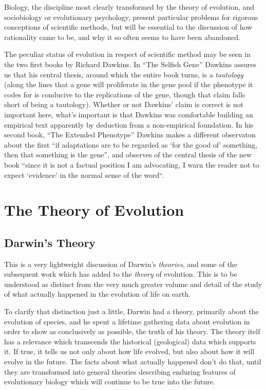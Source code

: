 \documentclass[10pt,titlepage]{book}
\begin{document}
Biology, the discipline most clearly transformed by the theory of evolution, and sociobiology or 
evolutionary psychology, present particular problems for rigorous conceptions of scientific methods, but will be essential to the discussion of how rationality came to be, and why it so often seems to have been abandoned.

The peculiar status of evolution in respect of scientific method may be seen in the two first books by Richard Dawkins.
In ``The Selfish Gene''\cite{dawkinsSG} Dawkins assures us that his central thesis, around which the entire book turns, is a \emph{tautology} (along the lines that a gene will proliferate in the gene pool if the phenotype it codes for is conducive to the replications of the gene, though that claim falls short of being a tautology).
Whether or not Dawkins' claim is correct is not important here, what's important is that Dawkins was comfortable building an empirical text apparently by deduction from a non-empirical foundation.
In his second book, ``The Extended Phenotype''\cite{dawkinsEP} Dawkins makes a different observaton about the first ``if adaptations are to be regarded as `for the good of' something, then that something is the gene'', and observes of the central thesis of the new book ``since it is not a factual position I am advocating, I warn the reader not to expect `evidence' in the normal sense of the word``.


\section{The Theory of Evolution}

\subsection{Darwin's Theory}

This is a very lightweight discussion of Darwin's \emph{theories}, and some of the subsequent work which has added to the \emph{theory} of evolution.
This is to be understood as distinct from the very much greater volume and detail of the study of what actually happened in the evolution of life on earth.

To clarify that distinction just a little, Darwin had a theory, primarily about the evolution of species, and he spent a lifetime gathering data about evolution in order to show as conclusively as possible, the truth of his theory.
The theory itelf has a relevance which transcends the historical (geological) data which supports it.
If true, it tells us not only about how life evolved, but also about how it will evolve in the future.
The facts about what actually happened don't do that, until they are transformed into general theories describing enduring features of evolutionary biology which will continue to be true into the future.
\end{document}
